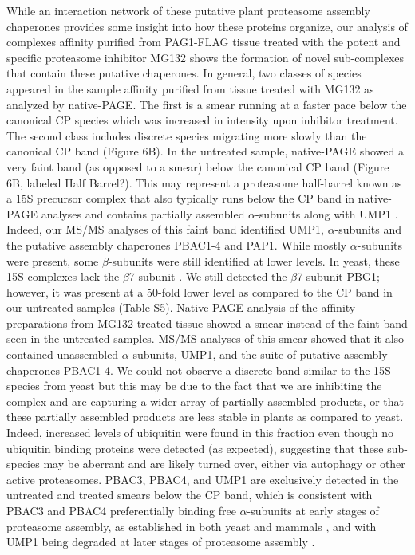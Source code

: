 While an interaction network of these putative plant proteasome assembly chaperones provides some insight into how these proteins organize, our analysis of complexes affinity purified from PAG1-FLAG tissue treated with the potent and specific proteasome inhibitor MG132 shows the formation of novel sub-complexes that contain these putative chaperones. In general, two classes of species appeared in the sample affinity purified from tissue treated with MG132 as analyzed by native-PAGE. The first is a smear running at a faster pace below the canonical CP species which was increased in intensity upon inhibitor treatment. The second class includes discrete species migrating more slowly than the canonical CP band (Figure 6B). In the untreated sample, native-PAGE showed a very faint band (as opposed to a smear) below the canonical CP band (Figure 6B, labeled Half Barrel?). This may represent a proteasome half-barrel known as a 15S precursor complex that also typically runs below the CP band in native-PAGE analyses and contains partially assembled $\alpha$-subunits along with UMP1 \citep{kock15}. Indeed, our MS/MS analyses of this faint band identified UMP1, $\alpha$-subunits and the putative assembly chaperones PBAC1-4 and PAP1. While mostly $\alpha$-subunits were present, some $\beta$-subunits were still identified at lower levels. In yeast, these 15S complexes lack the $\beta$7 subunit \citep{kock15}. We still detected the $\beta$7 subunit PBG1; however, it was present at a 50-fold lower level as compared to the CP band in our untreated samples (Table S5). Native-PAGE analysis of the affinity preparations from MG132-treated tissue showed a smear instead of the faint band seen in the untreated samples. MS/MS analyses of this smear showed that it also contained unassembled $\alpha$-subunits, UMP1, and the suite of putative assembly chaperones PBAC1-4. We could not observe a discrete band similar to the 15S species from yeast but this may be due to the fact that we are inhibiting the complex and are capturing a wider array of partially assembled products, or that these partially assembled products are less stable in plants as compared to yeast. Indeed, increased levels of ubiquitin were found in this fraction even though no ubiquitin binding proteins were detected (as expected), suggesting that these sub-species may be aberrant and are likely turned over, either via autophagy or other active proteasomes. PBAC3, PBAC4, and UMP1 are exclusively detected in the untreated and treated smears below the CP band, which is consistent with PBAC3 and PBAC4 preferentially binding free $\alpha$-subunits at early stages of proteasome assembly, as established in both yeast and mammals \citep{kunjappu14}, and with UMP1 being degraded at later stages of proteasome assembly \citep{ramos98}.

